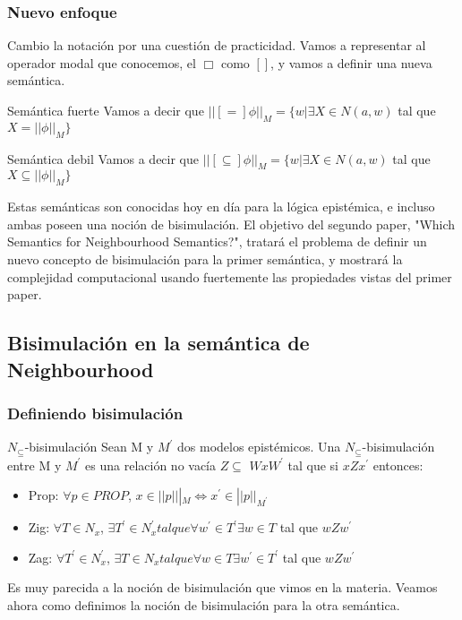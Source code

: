 \documentclass{beamer}
\begin{document}
\begin{frame}
\frametitle{Nuevo enfoque}

Cambio la notaci\'on por una cuesti\'on de practicidad. Vamos a representar al operador modal que conocemos, el $\Box$ como $[]$, y vamos a definir una nueva sem\'antica.

\begin{block}{Sem\'antica fuerte}
Vamos a decir que $||[=]\phi||_{M} = \{w | \exists X \in N(a,w)$ tal que $X = ||\phi||_{M}\}$
\end{block}


\begin{block}{Sem\'antica debil}
Vamos a decir que $||[\subseteq]\phi||_{M} = \{w | \exists X \in N(a,w)$ tal que $X \subseteq ||\phi||_{M}\}$
\end{block}

Estas sem\'anticas son conocidas hoy en d\'ia para la l\'ogica epist\'emica, e incluso ambas poseen una noci\'on de bisimulaci\'on. El objetivo del segundo paper, "Which Semantics for Neighbourhood Semantics?", tratar\'a el problema de definir un nuevo concepto de bisimulaci\'on para la primer sem\'antica, y mostrar\'a la complejidad computacional usando fuertemente las propiedades vistas del primer paper. 
\end{frame}

\subsection{Bisimulaci\'on en la sem\'antica de Neighbourhood}

\begin{frame}
\frametitle{Definiendo bisimulaci\'on}

\begin{block}{$N_{\subseteq}$-bisimulaci\'on}
Sean M y $M^{'}$ dos modelos epist\'emicos. Una $N_{\subseteq}$-bisimulaci\'on entre M y $M^{'}$ es una relaci\'on no vac\'ia $Z \subseteq$ $WxW^{'}$ tal que si $xZx^{'}$ entonces:
\begin{itemize}
\item Prop: $\forall p \in PROP$, $x \in ||p|||_{M} \iff x^{'} \in ||p||_{M^{'}}$
\item Zig: $\forall T \in N_{x}$, $\exists T^{'} \in N^{'}_{x} tal que \forall w^{'} \in T^{'} \exists w \in T$ tal que $wZw^{'}$
\item Zag: $\forall T^{'} \in N^{'}_{x}$, $\exists T \in N_{x} tal que \forall w \in T \exists w^{'} \in T^{'}$ tal que $wZw^{'}$
\end{itemize}
\end{block}

Es muy parecida a la noci\'on de bisimulaci\'on que vimos en la materia. Veamos ahora como definimos la noci\'on de bisimulaci\'on para la otra sem\'antica.

\end{frame}
\end{document}
